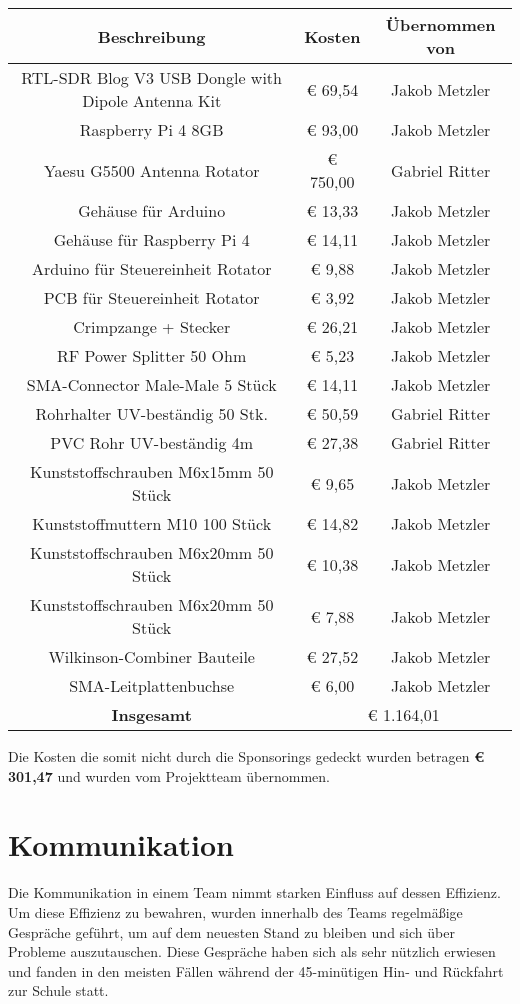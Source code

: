\begin{tabular}{|c|c|c|}
	\hline
	\textbf{Beschreibung} & \textbf{Kosten} & \textbf{Übernommen von} \\
	\hline
	RTL-SDR Blog V3 USB Dongle with Dipole Antenna Kit &  € 69,54  & Jakob Metzler \\
	\hline
	Raspberry Pi 4 8GB &  € 93,00  & Jakob Metzler \\
	\hline
	Yaesu G5500 Antenna Rotator &  € 750,00  & Gabriel Ritter \\
	\hline
	Gehäuse für Arduino &  € 13,33  & Jakob Metzler \\
	\hline
	Gehäuse für Raspberry Pi 4 &  € 14,11  & Jakob Metzler \\
	\hline
	Arduino für Steuereinheit Rotator &  € 9,88  & Jakob Metzler \\
	\hline
	PCB für Steuereinheit Rotator &  € 3,92  & Jakob Metzler \\
	\hline
	Crimpzange + Stecker &  € 26,21  & Jakob Metzler \\
	\hline
	RF Power Splitter 50 Ohm &  € 5,23  & Jakob Metzler \\
	\hline
	SMA-Connector Male-Male 5 Stück &  € 14,11  & Jakob Metzler \\
	\hline
	Rohrhalter UV-beständig 50 Stk. &  € 50,59  & Gabriel Ritter \\
	\hline
	PVC Rohr UV-beständig 4m &  € 27,38  & Gabriel Ritter \\
	\hline
	Kunststoffschrauben M6x15mm 50 Stück &  € 9,65  & Jakob Metzler \\
	\hline
	Kunststoffmuttern M10 100 Stück &  € 14,82  & Jakob Metzler \\
	\hline
	Kunststoffschrauben M6x20mm 50 Stück &  € 10,38  & Jakob Metzler \\
	\hline
	Kunststoffschrauben M6x20mm 50 Stück &  € 7,88  & Jakob Metzler \\
	\hline
	Wilkinson-Combiner Bauteile &  € 27,52  & Jakob Metzler \\
	\hline
	SMA-Leitplattenbuchse &  € 6,00  & Jakob Metzler \\
	\hhline{|===|}
	\textbf{Insgesamt} & \multicolumn{2}{c|}{€ 1.164,01} \\
	\hline
\end{tabular}

Die Kosten die somit nicht durch die Sponsorings gedeckt wurden betragen \textbf{€ 301,47} und wurden vom Projektteam übernommen. 

\section{Kommunikation}
Die Kommunikation in einem Team nimmt starken Einfluss auf dessen Effizienz. Um diese Effizienz zu bewahren, wurden innerhalb des Teams regelmäßige Gespräche geführt, um auf dem neuesten Stand zu bleiben und sich über Probleme auszutauschen. Diese Gespräche haben sich als sehr nützlich erwiesen und fanden in den meisten Fällen während der 45-minütigen Hin- und Rückfahrt zur Schule statt. 